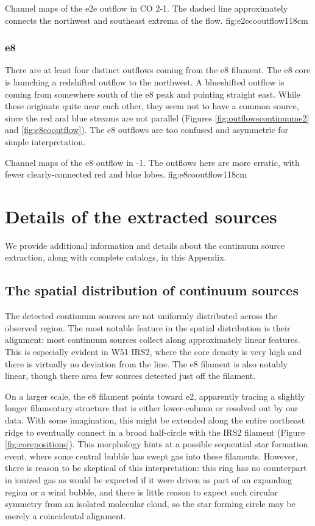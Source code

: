 \documentclass{aa}
\begin{document}
{Channel maps of the e2e outflow in CO 2-1.  The dashed line approximately
connects the northwest and southeast extrema of the flow.}
{fig:e2ecooutflow}{1}{18cm}

\subsubsection{e8}
There are at least four distinct outflows coming from the e8 filament.
The e8 core is launching a redshifted outflow to the northwest.  A blueshifted
outflow is coming from somewhere south of the e8 peak and pointing straight
east.  While these originate quite near each other, they seem not to have
a common source, since the red and blue streams are not parallel (Figures
\ref{fig:outflowscontinuume2} and \ref{fig:e8cooutflow}).  The e8 outflows are too
confused and asymmetric for simple interpretation.


{Channel maps of the e8 outflow in -1.  The outflows here are more
erratic, with fewer clearly-connected red and blue lobes.}
{fig:e8cooutflow}{1}{18cm}

\section{Details of the extracted sources}
\label{sec:contsrcs}
We provide additional information and details about the continuum
source extraction, along with complete catalogs, in this Appendix.

\subsection{The spatial distribution of continuum sources}
\label{sec:corespatialdistribution}
The detected continuum sources are not uniformly distributed across the
observed region.  The most notable feature in the spatial distribution is their
alignment: most continuum sources collect along approximately linear features.
This is especially evident in W51 IRS2, where the core density is very high and
there is virtually no deviation from the line.  The e8 filament is also notably
linear, though there area few sources detected just off the filament. 

On a larger scale, the e8 filament points toward e2, apparently tracing a
slightly longer filamentary structure that is either lower-column or resolved
out by our data.  With some imagination, this might be extended along the
entire northeast ridge to eventually connect in a broad half-circle with the
IRS2 filament (Figure \ref{fig:corepositions}).  This morphology hints at a
possible sequential star formation event, where some central bubble has swept
gas into these filaments.  However, there is reason to be skeptical of this
interpretation: this ring has no counterpart in ionized gas as would be
expected if it were driven as part of an expanding \hii region or a wind
bubble, and there is little reason to expect such circular symmetry from an
isolated molecular cloud, so the star forming circle may be merely a
coincidental alignment.
\end{document}
